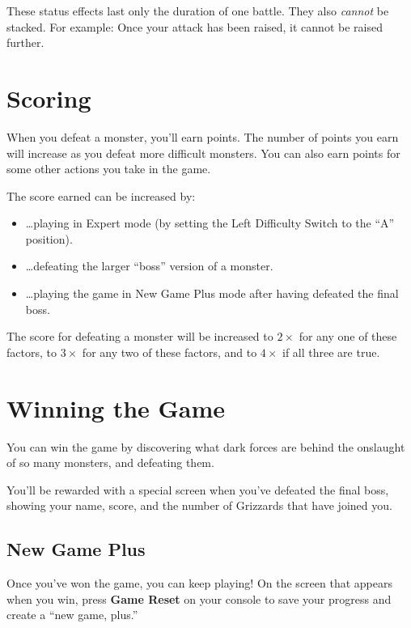\documentclass[10pt,twocolumn,openany,article]{memoir}
\newenvironment{ritemize}{\begin{itemize}\raggedright}{\end{itemize}}
\begin{document}
These status  effects last only  the duration  of one battle.  They also
\emph{cannot} be stacked. For example: Once your attack has been raised,
it cannot be raised further.

\section{Scoring}

When you defeat a monster, you'll  earn points. The number of points you
earn will increase  as you defeat more difficult monsters.  You can also
earn points for some other actions you take in the game.

The score earned can be increased by:

\begin{ritemize}
\item \ldots{}playing  in Expert  mode (by  setting the  Left Difficulty
  Switch to the ``A'' position).
\item \ldots{}defeating the larger ``boss'' version of a monster.
\item  \ldots{}playing the  game  in  New Game  Plus  mode after  having
  defeated the final boss.
\end{ritemize}

The score for  defeating a monster will be increased  to $2\times$ for any
one of these  factors, to $3\times$ for  any two of these  factors, and to
$4\times$ if all three are true.

\section{Winning the Game}

You can  win the  game by  discovering what dark  forces are  behind the
onslaught of so many monsters, and defeating them.

You'll  be rewarded  with  a  special screen  when  you've defeated  the
final boss, showing  your name, score, and the number  of Grizzards that
have joined you.

\subsection*{New Game Plus}\label{sec:NewGamePlus}

Once  you've won  the game,  you can  keep playing!  On the  screen that
appears when you win, press \textbf{Game  Reset} on your console to save
your progress and create a ``new game, plus.''
\end{document}
